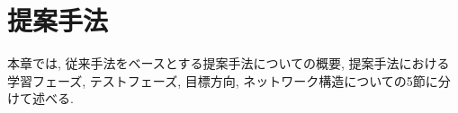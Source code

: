 \chapter{提案手法}
\label{chap:suggest}
%
本章では, 従来手法をベースとする提案手法についての概要, 提案手法における学習フェーズ, テストフェーズ, 目標方向, ネットワーク構造についての5節に分けて述べる.
%
%





%
